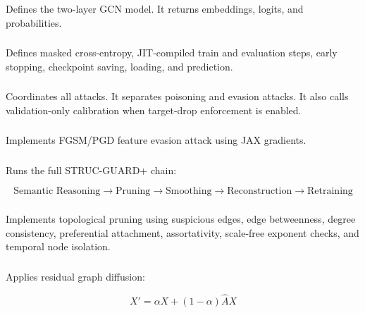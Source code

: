 \documentclass[12pt,a4paper]{article}
\begin{document}
\subsubsection{}
Defines the two-layer GCN model. It returns embeddings, logits, and probabilities.

\subsubsection{}
Defines masked cross-entropy, JIT-compiled train and evaluation steps, early stopping, checkpoint saving, loading, and prediction.

\subsubsection{}
Coordinates all attacks. It separates poisoning and evasion attacks. It also calls validation-only calibration when target-drop enforcement is enabled.

\subsubsection{}
Implements FGSM/PGD feature evasion attack using JAX gradients.

\subsubsection{}
Runs the full STRUC-GUARD+ chain:

$$
\text{Semantic Reasoning}\rightarrow \text{Pruning}\rightarrow \text{Smoothing}\rightarrow \text{Reconstruction}\rightarrow \text{Retraining}
$$

\subsubsection{}
Implements topological pruning using suspicious edges, edge betweenness, degree consistency, preferential attachment, assortativity, scale-free exponent checks, and temporal node isolation.

\subsubsection{}
Applies residual graph diffusion:

$$
X'=\alpha X+(1-\alpha)\hat{A}X
$$
\end{document}
